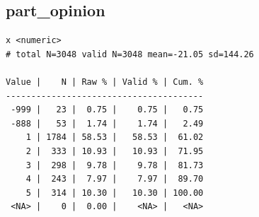 \documentclass[
  letterpaper,
  DIV=11,
  numbers=noendperiod]{scrreprt}
\newenvironment{Shaded}{\begin{snugshade}}{\end{snugshade}}
\newcommand{\AttributeTok}[1]{\textcolor[rgb]{0.40,0.45,0.13}{#1}}
\newcommand{\CommentTok}[1]{\textcolor[rgb]{0.37,0.37,0.37}{#1}}
\newcommand{\ConstantTok}[1]{\textcolor[rgb]{0.56,0.35,0.01}{#1}}
\newcommand{\DecValTok}[1]{\textcolor[rgb]{0.68,0.00,0.00}{#1}}
\newcommand{\FunctionTok}[1]{\textcolor[rgb]{0.28,0.35,0.67}{#1}}
\newcommand{\NormalTok}[1]{\textcolor[rgb]{0.00,0.23,0.31}{#1}}
\newcommand{\OtherTok}[1]{\textcolor[rgb]{0.00,0.23,0.31}{#1}}
\newcommand{\SpecialCharTok}[1]{\textcolor[rgb]{0.37,0.37,0.37}{#1}}
\newcommand{\StringTok}[1]{\textcolor[rgb]{0.13,0.47,0.30}{#1}}
\begin{document}
\hypertarget{part_opinion}{%
\subsection{part\_opinion}\label{part_opinion}}

\begin{Shaded}
\end{Shaded}

\begin{verbatim}
x <numeric> 
# total N=3048 valid N=3048 mean=-21.05 sd=144.26

Value |    N | Raw % | Valid % | Cum. %
---------------------------------------
 -999 |   23 |  0.75 |    0.75 |   0.75
 -888 |   53 |  1.74 |    1.74 |   2.49
    1 | 1784 | 58.53 |   58.53 |  61.02
    2 |  333 | 10.93 |   10.93 |  71.95
    3 |  298 |  9.78 |    9.78 |  81.73
    4 |  243 |  7.97 |    7.97 |  89.70
    5 |  314 | 10.30 |   10.30 | 100.00
 <NA> |    0 |  0.00 |    <NA> |   <NA>
\end{verbatim}

\begin{Shaded}
\end{Shaded}
\end{document}

